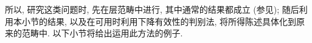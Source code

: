 所以, 研究这类问题时, 先在层范畴中进行,
其中通常的结果都成立 (参见);
随后利用本小节的结果, 以及在可用时利用下降有效性的判别法,
将所得陈述具体化到原来的范畴中.
以下小节将给出运用此方法的例子.

